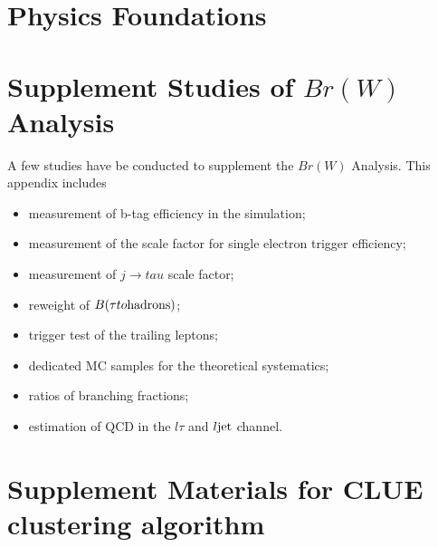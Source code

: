 \chapter{Physics Foundations}





\chapter{Supplement Studies of $Br(W)$ Analysis}

A few studies have be conducted to supplement the $Br(W)$ Analysis.
This appendix includes 
\begin{itemize}
    \item measurement of b-tag efficiency in the simulation;
    \item measurement of the scale factor for single electron trigger efficiency;
    \item measurement of $j \to tau$ scale factor;
    \item reweight of $B(\tau \to  \rm{hadrons})$;
    \item trigger test of the trailing leptons;
    \item dedicated MC samples for the \ttbar theoretical systematics;
    \item ratios of branching fractions;
    \item estimation of QCD in the $l\tau$ and $l\rm{jet}$ channel. 
\end{itemize}















% 




\chapter{Supplement Materials for CLUE clustering algorithm}

